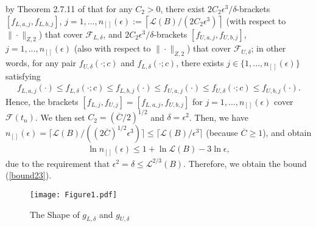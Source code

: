 \documentclass[12pt, fullpage]{amsart}
\theoremstyle{definition}
\theoremstyle{definition}
\theoremstyle{definition}
\begin{document}
\begin{bibunit}[econometrica]
 by Theorem 2.7.11 of \cite{vanderVaart/Wellner:96:WeakConvg} that for any $C_2>0$, there exist $2C_2\epsilon^3/\delta$-brackets  $[f_{L,a,j},f_{L,b,j}]$, $j=1,...,n_{[]}(\epsilon):=\left\lceil \mathcal{L}(B)/(2C_2\epsilon^3) \right\rceil$  (with respect to $\| \cdot \|_{Z,2}$) that cover
 $\mathcal{F}_{L,\delta}$, and $2C_2\epsilon^3/\delta$-brackets $[f_{U,a,j},f_{U,b,j}]$, $j=1,...,n_{[]}(\epsilon)$ (also with respect to  $\| \cdot \|_{Z,2}$) that cover $\mathcal{F}_{U,\delta}$; in other words,  for any pair $f_{U,\delta}(\cdot;c)$ and $f_{L,\delta}(\cdot;c)$, there exists $j\in \{1,...,n_{[]}(\epsilon)\}$  satisfying  
 \begin{align}
	\label{ineqs}
	f_{L,a,j}(\cdot) \le f_{L,\delta}(\cdot;c) \le f_{L,b,j}(\cdot) \le f_{U,a,j}(\cdot) \le f_{U,\delta}(\cdot;c) \le f_{U,b,j}(\cdot).
\end{align}
 Hence, the brackets $[f_{L,j},f_{U,j}] = [f_{L,a,j},f_{U,b,j}]$ for $j=1,...,n_{[]}(\epsilon)$ cover $\mathcal{F}(t_n)$. We then set  $C_2 =(\overline C/2)^{1/2}$ and $\delta =\epsilon^2$. Then, we have $n_{[]}(\epsilon)=\lceil \mathcal{L}(B)/((2\overline C)^{1/2} \epsilon^3) \rceil \le \lceil \mathcal{L}(B)/\epsilon^3 \rceil$ 
(because $\overline C \ge 1$), and obtain
\begin{align*}
	\ln n_{[]}(\epsilon) \le 1 + \ln \mathcal{L}(B) - 3\ln \epsilon,
\end{align*}
 due to the requirement that $\epsilon^2 = \delta \le \mathcal{L}^{2/3}(B)$. Therefore, we obtain the bound (\ref{bound23}). 

\begin{figure}[t]
	\begin{center}
		\texttt{[image: Figure1.pdf]}
		\caption{The Shape of $g_{L,\delta}$ and $g_{U,\delta}$}
		\label{fig1}
	\end{center}
\end{figure}


\end{bibunit}
\end{document}
